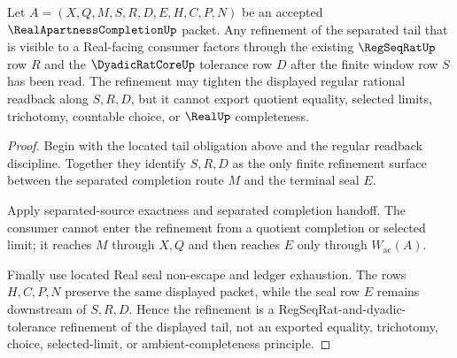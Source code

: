 \begin{theorem}
\label{thm:real-apartness-completion-regseqrat-refinement}
Let $A=(X,Q,M,S,R,D,E,H,C,P,N)$ be an accepted $\RealApartnessCompletionUp$ packet. Any refinement of the separated tail that is visible to a Real-facing consumer factors through the existing $\RegSeqRatUp$ row $R$ and the $\DyadicRatCoreUp$ tolerance row $D$ after the finite window row $S$ has been read. The refinement may tighten the displayed regular rational readback along $S,R,D$, but it cannot export quotient equality, selected limits, trichotomy, countable choice, or $\RealUp$ completeness.
\end{theorem}
\begin{proof}
Begin with the located tail obligation above and the regular readback discipline. Together they identify $S,R,D$ as the only finite refinement surface between the separated completion route $M$ and the terminal seal $E$.

Apply separated-source exactness and separated completion handoff. The consumer cannot enter the refinement from a quotient completion or selected limit; it reaches $M$ through $X,Q$ and then reaches $E$ only through $W_{\mathrm{ac}}(A)$.

Finally use located Real seal non-escape and ledger exhaustion. The rows $H,C,P,N$ preserve the same displayed packet, while the seal row $E$ remains downstream of $S,R,D$. Hence the refinement is a RegSeqRat-and-dyadic-tolerance refinement of the displayed tail, not an exported equality, trichotomy, choice, selected-limit, or ambient-completeness principle.
\end{proof}

